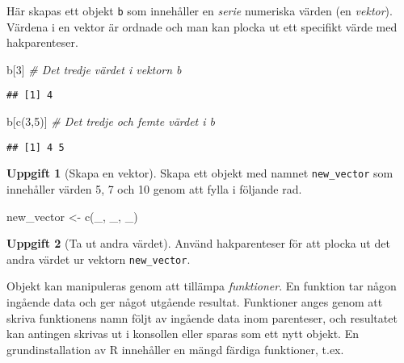\documentclass[
]{book}
\newenvironment{Shaded}{\begin{snugshade}}{\end{snugshade}}
\newcommand{\CommentTok}[1]{\textcolor[rgb]{0.56,0.35,0.01}{\textit{#1}}}
\newcommand{\DecValTok}[1]{\textcolor[rgb]{0.00,0.00,0.81}{#1}}
\newcommand{\FunctionTok}[1]{\textcolor[rgb]{0.00,0.00,0.00}{#1}}
\newcommand{\NormalTok}[1]{#1}
\newcommand{\OtherTok}[1]{\textcolor[rgb]{0.56,0.35,0.01}{#1}}
\theoremstyle{definition}
\theoremstyle{definition}
\theoremstyle{definition}
\newtheorem{exercise}{Uppgift}[chapter]
\theoremstyle{definition}
\theoremstyle{remark}
\begin{document}
Här skapas ett objekt \texttt{b} som innehåller en \emph{serie} numeriska värden (en \emph{vektor}). Värdena i en vektor är ordnade och man kan plocka ut ett specifikt värde med hakparenteser.

\begin{Shaded}
\begin{Highlighting}[]
\NormalTok{b[}\DecValTok{3}\NormalTok{]               }\CommentTok{\# Det tredje värdet i vektorn b}
\end{Highlighting}
\end{Shaded}

\begin{verbatim}
## [1] 4
\end{verbatim}

\begin{Shaded}
\begin{Highlighting}[]
\NormalTok{b[}\FunctionTok{c}\NormalTok{(}\DecValTok{3}\NormalTok{,}\DecValTok{5}\NormalTok{)]          }\CommentTok{\# Det tredje och femte värdet i b}
\end{Highlighting}
\end{Shaded}

\begin{verbatim}
## [1] 4 5
\end{verbatim}

\begin{exercise}[Skapa en vektor]

Skapa ett objekt med namnet \texttt{new\_vector} som innehåller värden 5, 7 och 10 genom att fylla i följande rad.

\begin{Shaded}
\begin{Highlighting}[]
\NormalTok{new\_vector }\OtherTok{\textless{}{-}} \FunctionTok{c}\NormalTok{(\_, \_, \_)}
\end{Highlighting}
\end{Shaded}

\end{exercise}

\begin{exercise}[Ta ut andra värdet]
Använd hakparenteser för att plocka ut det andra värdet ur vektorn \texttt{new\_vector}.
\end{exercise}

Objekt kan manipuleras genom att tillämpa \emph{funktioner}. En funktion tar någon ingående data och ger något utgående resultat. Funktioner anges genom att skriva funktionens namn följt av ingående data inom parenteser, och resultatet kan antingen skrivas ut i konsollen eller sparas som ett nytt objekt. En grundinstallation av R innehåller en mängd färdiga funktioner, t.ex.
\end{document}
